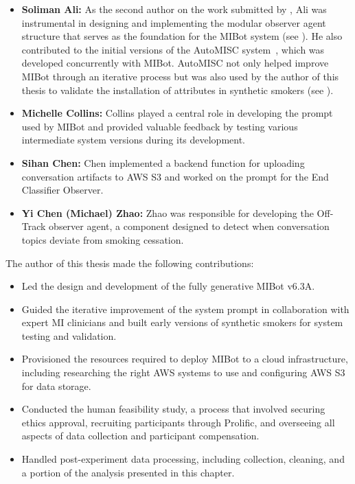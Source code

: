\begin{itemize}
	\item \textbf{Soliman Ali:} As the second author on the work submitted by \citet{mahmood-etal-2025-fully}, Ali was instrumental in designing and implementing the modular observer agent structure that serves as the foundation for the MIBot system (see ). He also contributed to the initial versions of the AutoMISC system~\citep{ali2025thesis,ali2025automated}, which was developed concurrently with MIBot. AutoMISC not only helped improve MIBot through an iterative process but was also used by the author of this thesis to validate the installation of attributes in synthetic smokers (see ).

	\item \textbf{Michelle Collins:} Collins played a central role in developing the prompt used by MIBot and provided valuable feedback by testing various intermediate system versions during its development.

	\item \textbf{Sihan Chen:} Chen implemented a backend function for uploading conversation artifacts to AWS S3 and worked on the prompt for the End Classifier Observer.

	\item \textbf{Yi Chen (Michael) Zhao:} Zhao was responsible for developing the Off-Track observer agent, a component designed to detect when conversation topics deviate from smoking cessation.
\end{itemize}

The author of this thesis made the following contributions:

\begin{itemize}
	\item Led the design and development of the fully generative MIBot v6.3A.

	\item Guided the iterative improvement of the system prompt in collaboration with expert MI clinicians and built early versions of synthetic smokers for system testing and validation.

	\item Provisioned the resources required to deploy MIBot to a cloud infrastructure, including researching the right AWS systems to use and configuring AWS S3 for data storage.

	\item Conducted the human feasibility study, a process that involved securing ethics approval, recruiting participants through Prolific, and overseeing all aspects of data collection and participant compensation.

	\item Handled post-experiment data processing, including collection, cleaning, and a portion of the analysis presented in this chapter.
\end{itemize}
